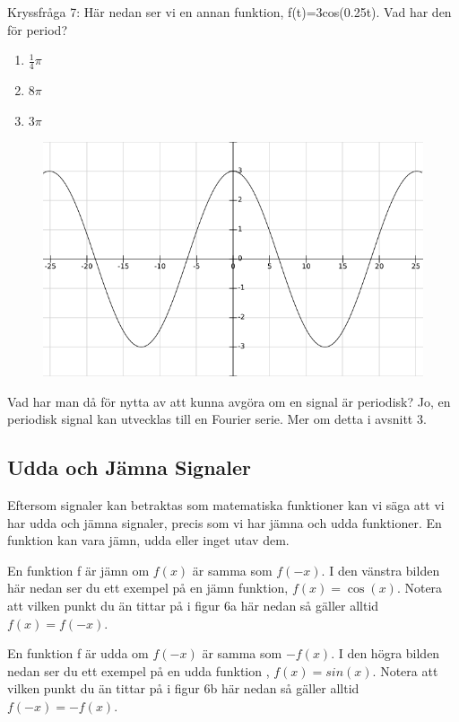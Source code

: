\documentclass{article}
\begin{document}
\newpage

Kryssfråga 7: Här nedan ser vi en annan funktion, f(t)=3cos(0.25t).
Vad har den för period?
\begin{enumerate}[label={\alph*)},font={\bfseries}]
    \item $\frac{1}{4}\pi$
    \item $8\pi$
    \item $3\pi$
\end{enumerate}

\begin{figure}[ht]
\centerline{\includegraphics[scale=0.50]{image11.png}}
\caption{}
\label{}
\end{figure}

Vad har man då för nytta av att kunna avgöra om en signal är periodisk?
Jo, en periodisk signal kan utvecklas till en Fourier serie. Mer om detta i avsnitt 3.

\newpage

\subsection{Udda och Jämna Signaler}

Eftersom signaler kan betraktas som matematiska funktioner kan vi säga att vi
har udda och jämna signaler, precis som vi har jämna och udda funktioner.
En funktion kan vara jämn, udda eller inget utav dem.

En funktion f är jämn om $f(x)$ är samma som $f(-x)$.
I den vänstra bilden här nedan ser du ett exempel på en jämn funktion,
$f(x)=\cos(x)$. Notera att vilken punkt du än tittar på i figur 6a här
nedan så gäller alltid  $f(x) = f(-x)$.

En funktion f är udda om $f(-x)$ är samma som $-f(x)$. I den högra bilden
nedan ser du ett exempel på en udda funktion , $f(x)=sin(x)$.
Notera att vilken punkt du än tittar på i figur 6b här nedan så gäller
alltid $f(-x) = -f(x)$.
\end{document}
